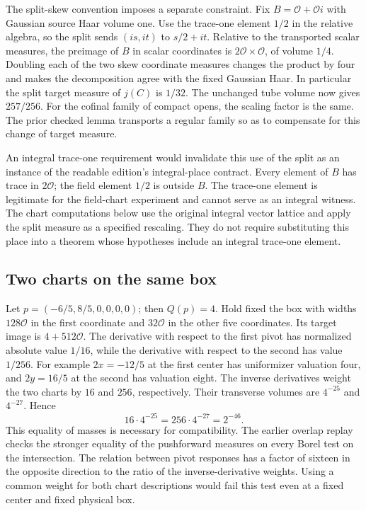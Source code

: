 \documentclass[12pt,letterpaper]{article}
\begin{document}
The split-skew convention imposes a separate constraint. Fix \(B=\mathcal O+\mathcal O i\) with Gaussian source Haar volume one. Use the trace-one element \(1/2\) in the relative algebra, so the split sends \((is,it)\) to \(s/2+it\). Relative to the transported scalar measures, the preimage of \(B\) in scalar coordinates is \(2\mathcal O\times\mathcal O\), of volume \(1/4\). Doubling each of the two skew coordinate measures changes the product by four and makes the decomposition agree with the fixed Gaussian Haar. In particular the split target measure of \(j(C)\) is \(1/32\). The unchanged tube volume now gives \(257/256\). For the cofinal family of compact opens, the scaling factor is the same. The prior checked lemma transports a regular family so as to compensate for this change of target measure.

An integral trace-one requirement would invalidate this use of the split as an instance of the readable edition's integral-place contract. Every element of \(B\) has trace in \(2\mathcal O\); the field element \(1/2\) is outside \(B\). The trace-one element is legitimate for the field-chart experiment and cannot serve as an integral witness. The chart computations below use the original integral vector lattice and apply the split measure as a specified rescaling. They do not require substituting this place into a theorem whose hypotheses include an integral trace-one element.

\subsection{Two charts on the same box}
Let \(p=(-6/5,8/5,0,0,0,0)\); then \(Q(p)=4\). Hold fixed the box with widths \(128\mathcal O\) in the first coordinate and \(32\mathcal O\) in the other five coordinates. Its target image is \(4+512\mathcal O\). The derivative with respect to the first pivot has normalized absolute value \(1/16\), while the derivative with respect to the second has value \(1/256\). For example \(2x=-12/5\) at the first center has uniformizer valuation four, and \(2y=16/5\) at the second has valuation eight. The inverse derivatives weight the two charts by \(16\) and \(256\), respectively. Their transverse volumes are \(4^{-25}\) and \(4^{-27}\). Hence
\[
  16\cdot4^{-25}=256\cdot4^{-27}=2^{-46}.
\]
This equality of masses is necessary for compatibility. The earlier overlap replay checks the stronger equality of the pushforward measures on every Borel test on the intersection. The relation between pivot responses has a factor of sixteen in the opposite direction to the ratio of the inverse-derivative weights. Using a common weight for both chart descriptions would fail this test even at a fixed center and fixed physical box.
\end{document}
